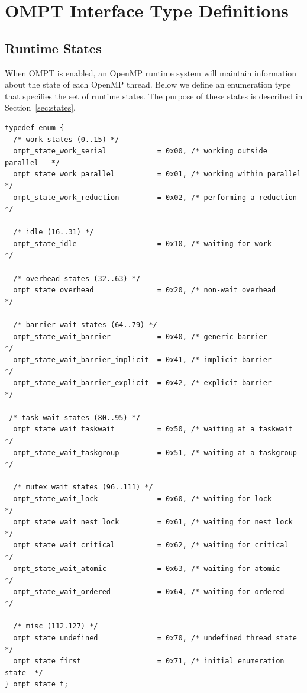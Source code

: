 \documentclass{article}
\begin{document}
{\section{OMPT Interface Type Definitions}
\label{appendix:ompt-types}
\subsection{Runtime States}
\label{appendix:ompt-types:states}

When OMPT is enabled, an OpenMP runtime system will maintain information about the state of  each OpenMP thread. 
Below we define an enumeration type that specifies the set of runtime states. 
The purpose of these states is described in Section~\ref{sec:states}.

\begin{verbatim}
typedef enum {
  /* work states (0..15) */
  ompt_state_work_serial            = 0x00, /* working outside parallel   */
  ompt_state_work_parallel          = 0x01, /* working within parallel    */
  ompt_state_work_reduction         = 0x02, /* performing a reduction     */

  /* idle (16..31) */
  ompt_state_idle                   = 0x10, /* waiting for work           */

  /* overhead states (32..63) */
  ompt_state_overhead               = 0x20, /* non-wait overhead          */

  /* barrier wait states (64..79) */
  ompt_state_wait_barrier           = 0x40, /* generic barrier            */
  ompt_state_wait_barrier_implicit  = 0x41, /* implicit barrier           */
  ompt_state_wait_barrier_explicit  = 0x42, /* explicit barrier           */
    
 /* task wait states (80..95) */
  ompt_state_wait_taskwait          = 0x50, /* waiting at a taskwait      */
  ompt_state_wait_taskgroup         = 0x51, /* waiting at a taskgroup     */
	
  /* mutex wait states (96..111) */	      	    
  ompt_state_wait_lock              = 0x60, /* waiting for lock           */
  ompt_state_wait_nest_lock         = 0x61, /* waiting for nest lock      */
  ompt_state_wait_critical          = 0x62, /* waiting for critical       */
  ompt_state_wait_atomic            = 0x63, /* waiting for atomic         */
  ompt_state_wait_ordered           = 0x64, /* waiting for ordered        */

  /* misc (112.127) */
  ompt_state_undefined              = 0x70, /* undefined thread state     */
  ompt_state_first                  = 0x71, /* initial enumeration state  */
} ompt_state_t;
\end{verbatim}
\clearpage
}
\end{document}
